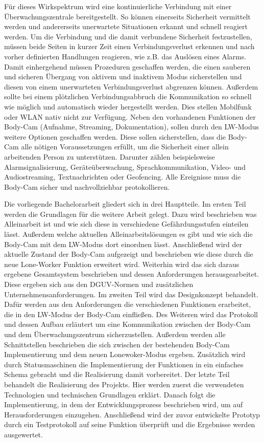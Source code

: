\documentclass[thesis.tex]{subfiles}
\begin{document}
Für dieses Wirkspektrum wird eine kontinuierliche Verbindung mit einer Überwachungszentrale bereitgestellt.
So können einerseits Sicherheit vermittelt werden und andererseits unerwartete Situationen erkannt und schnell reagiert werden.
Um die Verbindung und die damit verbundene Sicherheit festzustellen, müssen beide Seiten in kurzer Zeit einen Verbindungsverlust erkennen und nach vorher definierten Handlungen reagieren, wie z.B. das Auslösen eines Alarms.
Damit einhergehend müssen Prozeduren geschaffen werden, die einen sauberen und sicheren Übergang von aktivem und inaktivem Modus sicherstellen und diesen von einem unerwarteten Verbindungsverlust abgrenzen können.
Außerdem sollte bei einem plötzlichen Verbindungsabbruch die Kommunikation so schnell wie möglich und automatisch wieder hergestellt werden.
Dies stellen Mobilfunk oder WLAN nativ nicht zur Verfügung.
Neben den vorhandenen Funktionen der Body-Cam (Aufnahme, Streaming, Dokumentation), sollen durch den LW-Modus weitere Optionen geschaffen werden.
Diese sollen sicherstellen, dass die Body-Cam alle nötigen Voraussetzungen erfüllt, um die Sicherheit einer allein arbeitenden Person zu unterstützen.
Darunter zählen beispielsweise Alarmsignalisierung, Geräteüberwachung, Sprachkommunikation, Video- und Audiostreaming, Textnachrichten oder Geofencing.
Alle Ereignisse muss die Body-Cam sicher und nachvollziehbar protokollieren.

Die vorliegende Bachelorarbeit gliedert sich in drei Hauptteile.
Im ersten Teil werden die Grundlagen für die weitere Arbeit gelegt.
Dazu wird beschrieben was Alleinarbeit ist und wie sich diese in verschiedene Gefährdungsstufen einteilen lässt.
Außerdem welche aktuellen Alleinarbeitslösungen es gibt und wie sich die Body-Cam mit dem LW-Modus dort einordnen lässt.
Anschließend wird der aktuelle Zustand der Body-Cam aufgezeigt und beschrieben wie diese durch die neue Lone-Worker Funktion erweitert wird.
Weiterhin wird das sich daraus ergebene Gesamtsystem beschrieben und dessen Anforderungen herausgearbeitet.
Diese ergeben sich aus den DGUV-Normen und zusätzlichen Unternehmensanforderungen.
Im zweiten Teil wird das Designkonzept behandelt.
Dafür werden aus den Anforderungen die verschiedenen Funktionen erarbeitet, die in den LW-Modus der Body-Cam einfließen.
Des Weiteren wird das Protokoll und dessen Aufbau erläutert um eine Kommunikation zwischen der Body-Cam und dem Überwachungszentrum sicherzustellen.
Außerdem werden alle Schnittstellen beschrieben die sich zwischen der bestehenden Body-Cam Implementierung und dem neuen Lonewoker-Modus ergeben.
Zusätzlich wird durch Statusmaschinen die Implementierung der Funktionen in ein einfaches Schema gebracht und die Realisierung damit vorbereitet.
Der letzte Teil behandelt die Realisierung des Projekts.
Hier werden zuerst die verwendeten Technologien und technischen Grundlagen erklärt.
Danach folgt die Implementierung, in dem der Entwicklungsprozess beschrieben wird, um auf Herausforderungen einzugehen.
Anschließend wird der zuvor entwickelte Prototyp durch ein Testprotokoll auf seine Funktion überprüft und die Ergebnisse werden ausgewertet.
\end{document}
